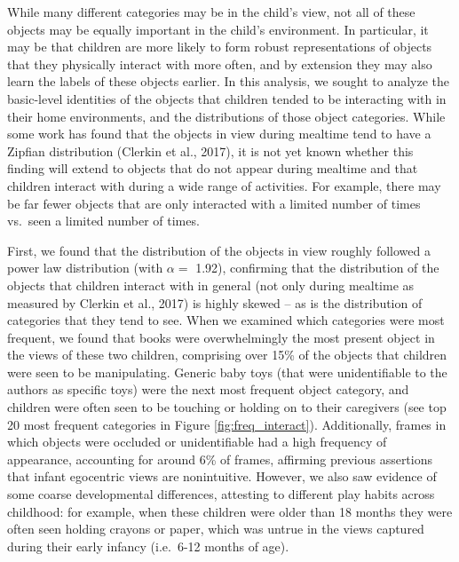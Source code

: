 \documentclass[10pt, letterpaper]{article}
\begin{document}
While many different categories may be in the child's view, not all of
these objects may be equally important in the child's environment. In
particular, it may be that children are more likely to form robust
representations of objects that they physically interact with more
often, and by extension they may also learn the labels of these objects
earlier. In this analysis, we sought to analyze the basic-level
identities of the objects that children tended to be interacting with in
their home environments, and the distributions of those object
categories. While some work has found that the objects in view during
mealtime tend to have a Zipfian distribution (Clerkin et al., 2017), it
is not yet known whether this finding will extend to objects that do not
appear during mealtime and that children interact with during a wide
range of activities. For example, there may be far fewer objects that
are only interacted with a limited number of times vs.~seen a limited
number of times.

First, we found that the distribution of the objects in view roughly
followed a power law distribution (with \(\alpha =\) 1.92), confirming
that the distribution of the objects that children interact with in
general (not only during mealtime as measured by Clerkin et al., 2017)
is highly skewed -- as is the distribution of categories that they tend
to see. When we examined which categories were most frequent, we found
that books were overwhelmingly the most present object in the views of
these two children, comprising over 15\% of the objects that children
were seen to be manipulating. Generic baby toys (that were
unidentifiable to the authors as specific toys) were the next most
frequent object category, and children were often seen to be touching or
holding on to their caregivers (see top 20 most frequent categories in
Figure \ref{fig:freq_interact}). Additionally, frames in which objects
were occluded or unidentifiable had a high frequency of appearance,
accounting for around 6\% of frames, affirming previous assertions that
infant egocentric views are nonintuitive. However, we also saw evidence
of some coarse developmental differences, attesting to different play
habits across childhood: for example, when these children were older
than 18 months they were often seen holding crayons or paper, which was
untrue in the views captured during their early infancy (i.e.~6-12
months of age).
\end{document}
